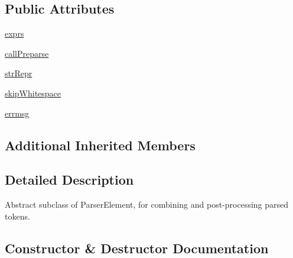 \subsection*{Public Attributes}
\begin{DoxyCompactItemize}
\item 
\hyperlink{classsetuptools_1_1__vendor_1_1pyparsing_1_1ParseExpression_a4e2611e5f2c7118fb18cdc4a710bd3db}{exprs}
\item 
\hyperlink{classsetuptools_1_1__vendor_1_1pyparsing_1_1ParseExpression_a66ce3bbb428462ec20ce5b4280f067fe}{call\+Preparse}
\item 
\hyperlink{classsetuptools_1_1__vendor_1_1pyparsing_1_1ParseExpression_a167620f1d1a41f57c779b877765a3c35}{str\+Repr}
\item 
\hyperlink{classsetuptools_1_1__vendor_1_1pyparsing_1_1ParseExpression_a41c4841532e05e52578a9db2533f18f1}{skip\+Whitespace}
\item 
\hyperlink{classsetuptools_1_1__vendor_1_1pyparsing_1_1ParseExpression_afa1df56aa11b4bd94e10b3f1770867f6}{errmsg}
\end{DoxyCompactItemize}
\subsection*{Additional Inherited Members}


\subsection{Detailed Description}
\begin{DoxyVerb}Abstract subclass of ParserElement, for combining and post-processing parsed tokens.
\end{DoxyVerb}
 

\subsection{Constructor \& Destructor Documentation}
\mbox{\label{classsetuptools_1_1__vendor_1_1pyparsing_1_1ParseExpression_a7cd8a69a2468f1ecdc5c1a8f89e22e91}} 
